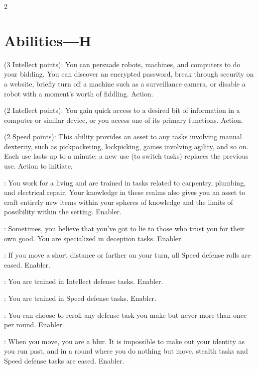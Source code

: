 \begin{multicols}{2}

\section{Abilities—H}

 (3 Intellect points): You can persuade robots, machines, and computers to do your bidding. You can discover an encrypted password, break through security on a website, briefly turn off a machine such as a surveillance camera, or disable a robot with a moment’s worth of fiddling. Action. 
 
 (2 Intellect points): You gain quick access to a desired bit of information in a computer or similar device, or you access one of its primary functions. Action. 
 
 (2 Speed points): This ability provides an asset to any tasks involving manual dexterity, such as pickpocketing, lockpicking, games involving agility, and so on. Each use lasts up to a minute; a new use (to switch tasks) replaces the previous use. Action to initiate. 
 
: You work for a living and are trained in tasks related to carpentry, plumbing, and electrical repair. Your knowledge in these realms also gives you an asset to craft entirely new items within your spheres of knowledge and the limits of possibility within the setting. Enabler. 
 
: Sometimes, you believe that you’ve got to lie to those who trust you for their own good. You are specialized in deception tasks. Enabler. 
 
: If you move a short distance or farther on your turn, all Speed defense rolls are eased. Enabler. 
 
: You are trained in Intellect defense tasks. Enabler. 
 
: You are trained in Speed defense tasks. Enabler. 
 
: You can choose to reroll any defense task you make but never more than once per round. Enabler. 
 
: When you move, you are a blur. It is impossible to make out your identity as you run past, and in a round where you do nothing but move, stealth tasks and Speed defense tasks are eased. Enabler. 
 

\end{multicols}
